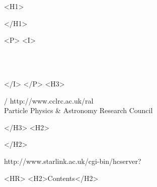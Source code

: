 \begin{htmlonly}
   \xlabel{}
   \begin{rawhtml} <H1> \end{rawhtml}
      \stardoctitle
   \begin{rawhtml} </H1> \end{rawhtml}


   \begin{rawhtml} <P> <I> \end{rawhtml}
   \stardoccategory \stardocnumber \\
   \stardocauthors \\
   \stardocdate
   \begin{rawhtml} </I> </P> <H3> \end{rawhtml}
       /
                        {http://www.cclrc.ac.uk/ral} \\
      Particle Physics \& Astronomy Research Council \\
   \begin{rawhtml} </H3> <H2> \end{rawhtml}
   \begin{rawhtml} </H2> \end{rawhtml}
      {http://www.starlink.ac.uk/cgi-bin/hcserver?\stardocsource}\\

  \label{stardoccontents}
  \begin{rawhtml} 
    <HR>
    <H2>Contents</H2>
  \end{rawhtml}
  \renewcommand{\latexonlytoc}[0]{}


\end{htmlonly}

